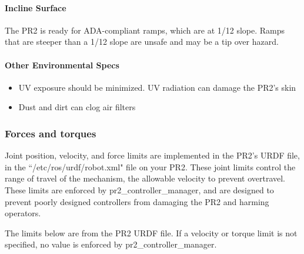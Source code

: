 \paragraph{Incline Surface}

The PR2 is ready for ADA-compliant ramps, which are at 1/12 slope. Ramps that are steeper than a 1/12 slope are unsafe and may be a tip over hazard.

\paragraph{Other Environmental Specs}

\begin{itemize}
\item UV exposure should be minimized. UV radiation can damage the PR2's skin
\item Dust and dirt can clog air filters
\end{itemize}

\subsubsection{Forces and torques}

Joint position, velocity, and force limits are implemented in the PR2's URDF file, in the ``/etc/ros/urdf/robot.xml" file on your PR2. These joint limits control the range of travel of the mechanism, the allowable velocity to prevent overtravel. These limits are enforced by pr2\_controller\_manager, and are designed to prevent poorly designed controllers from damaging the PR2 and harming operators. 



The limits below are from the PR2 URDF file. If a velocity or torque limit is not specified, no value is enforced by pr2\_controller\_manager.

